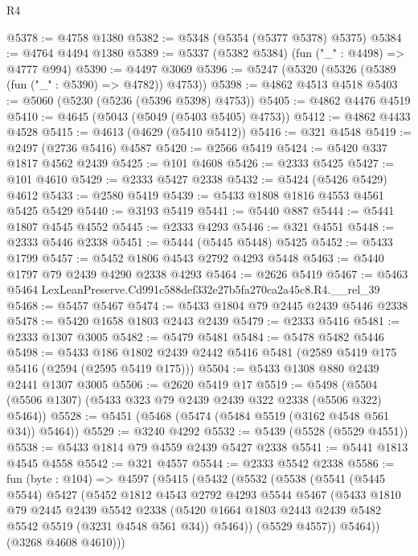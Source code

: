 \begin{lexlean}{R4}
\begin{coremodule}
@5378 := @4758 @1380
@5382 := @5348 (@5354 (@5377 @5378) @5375)
@5384 := @4764 @4494 @1380
@5389 := @5337 (@5382 @5384) (fun ("_" : @4498) => @4777 @994)
@5390 := @4497 @3069
@5396 := @5247 (@5320 (@5326 (@5389 (fun ("_" : @5390) => @4782)) @4753))
@5398 := @4862 @4513 @4518
@5403 := @5060 (@5230 (@5236 (@5396 @5398) @4753))
@5405 := @4862 @4476 @4519
@5410 := @4645 (@5043 (@5049 (@5403 @5405) @4753))
@5412 := @4862 @4433 @4528
@5415 := @4613 (@4629 (@5410 @5412))
@5416 := @321 @4548
@5419 := @2497 (@2736 @5416) @4587
@5420 := @2566 @5419
@5424 := @5420 @337 @1817 @4562 @2439
@5425 := @101 @4608
@5426 := @2333 @5425
@5427 := @101 @4610
@5429 := @2333 @5427 @2338
@5432 := @5424 (@5426 @5429) @4612
@5433 := @2580 @5419
@5439 := @5433 @1808 @1816 @4553 @4561 @5425 @5429
@5440 := @3193 @5419
@5441 := @5440 @887
@5444 := @5441 @1807 @4545 @4552
@5445 := @2333 @4293
@5446 := @321 @4551
@5448 := @2333 @5446 @2338
@5451 := @5444 (@5445 @5448) @5425
@5452 := @5433 @1799
@5457 := @5452 @1806 @4543 @2792 @4293 @5448
@5463 := @5440 @1797 @79 @2439 @4290 @2338 @4293
@5464 := @2626 @5419
@5467 := @5463 @5464 LexLeanPreserve.Cd991c588def332e27b5fa270ca2a45c8.R4.__rel_39
@5468 := @5457 @5467
@5474 := @5433 @1804 @79 @2445 @2439 @5446 @2338
@5478 := @5420 @1658 @1803 @2443 @2439
@5479 := @2333 @5416
@5481 := @2333 @1307 @3005
@5482 := @5479 @5481
@5484 := @5478 @5482 @5446
@5498 := @5433
    @186
    @1802
    @2439
    @2442
    @5416
    @5481
    (@2589 @5419 @175 @5416 (@2594 (@2595 @5419 @175)))
@5504 := @5433 @1308 @880 @2439 @2441 @1307 @3005
@5506 := @2620 @5419 @17
@5519 := @5498 (@5504 (@5506 @1307) (@5433 @323 @79 @2439 @2439 @322 @2338 (@5506 @322) @5464))
@5528 := @5451 (@5468 (@5474 (@5484 @5519 (@3162 @4548 @561 @34)) @5464))
@5529 := @3240 @4292
@5532 := @5439 (@5528 (@5529 @4551))
@5538 := @5433 @1814 @79 @4559 @2439 @5427 @2338
@5541 := @5441 @1813 @4545 @4558
@5542 := @321 @4557
@5544 := @2333 @5542 @2338
@5586 := fun (byte : @104) =>
  @4597
    (@5415
      (@5432
        (@5532
          (@5538
            (@5541
              (@5445 @5544)
              @5427
              (@5452
                @1812
                @4543
                @2792
                @4293
                @5544
                @5467
                (@5433
                  @1810
                  @79
                  @2445
                  @2439
                  @5542
                  @2338
                  (@5420 @1664 @1803 @2443 @2439 @5482 @5542 @5519 (@3231 @4548 @561 @34))
                  @5464))
              (@5529 @4557))
            @5464))
        (@3268 @4608 @4610)))

\end{coremodule}
\end{lexlean}
